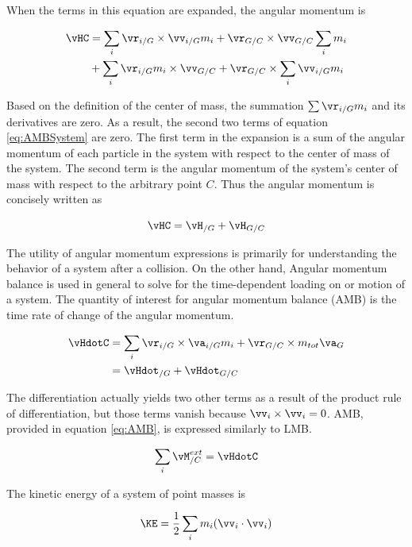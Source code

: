 When the terms in this equation are expanded, the angular momentum is

\begin{align}
\vHC &= \sum_{i} \vr_{i/G} \times \vv_{i/G} m_{i} + \vr_{G/C} \times \vv_{G/C} \sum_{i} m_{i} \notag \\
& + \sum_{i} \vr_{i/G} m_{i} \times \vv_{G/C} + \vr_{G/C} \times \sum_{i} \vv_{i/G} m_{i}
\label{eq:AMBSystem}
\end{align}

Based on the definition of the center of mass, the summation $\sum \vr_{i/G}m_{i}$ and its derivatives are zero. As a result, the second two terms of equation \ref{eq:AMBSystem} are zero. The first term in the expansion is a sum of the angular momentum of each particle in the system with respect to the center of mass of the system. The second term is the angular momentum of the system's center of mass with respect to the arbitrary point $C$. Thus the angular momentum is concisely written as

\begin{equation}
\vHC = \vH_{/G} + \vH_{G/C}
\end{equation}

The utility of angular momentum expressions is primarily for understanding the behavior of a system after a collision. On the other hand, Angular momentum balance is used in general to solve for the time-dependent loading on or motion of a system. The quantity of interest for angular momentum balance (AMB) is the time rate of change of the angular momentum. 

\begin{align}
\vHdotC &= \sum_{i} \vr_{i/G} \times \va_{i/G} m_{i} + \vr_{G/C} \times m_{tot} \va_{G} \\
 &= \vHdot_{/G} + \vHdot_{G/C} 
\end{align}

The differentiation actually yields two other terms as a result of the product rule of differentiation, but those terms vanish because $\vv_{i} \times \vv_{i} = 0$. AMB, provided in equation \ref{eq:AMB}, is expressed similarly to LMB.

\begin{equation}
\sum_{i} \vM_{/C}^{ext} = \vHdotC
\label{eq:AMB}
\end{equation}

The kinetic energy of a system of point masses is

\begin{equation}
\KE = \frac{1}{2} \sum_{i} m_{i} (\vv_{i} \cdot \vv_{i})
\end{equation}

